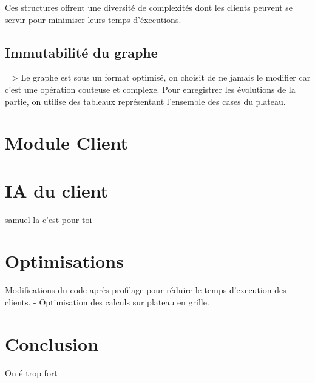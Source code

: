 \documentclass{article}
\begin{document}
Ces structures offrent une diversit\'e de complexit\'es dont les clients 
peuvent se servir pour minimiser leurs temps d'\'executions.

\subsection{Immutabilité du graphe}
=> Le graphe est sous un format optimisé, on choisit de ne jamais 
le modifier car c'est une opération couteuse et complexe. Pour 
enregistrer les évolutions de la partie, on utilise des 
tableaux représentant l'ensemble des cases du plateau.


\section{Module Client}
\section{IA du client}
samuel la c'est pour toi

\section{Optimisations}
Modifications du code après profilage pour réduire le temps 
d'execution des clients.
- Optimisation des calculs sur plateau en grille.


\section{Conclusion}
On é trop fort
\end{document}
